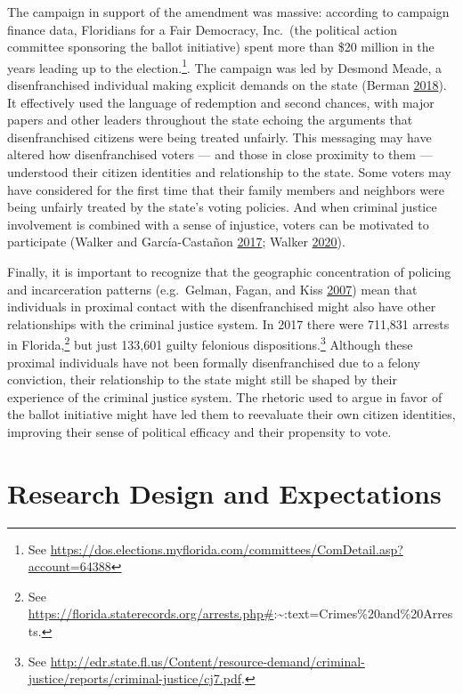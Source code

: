 \documentclass[
  12pt,
]{article}
\begin{document}
The campaign in support of the amendment was massive: according to campaign finance data, Floridians for a Fair Democracy, Inc.~(the political action committee sponsoring the ballot initiative) spent more than \$20 million in the years leading up to the election.\footnote{See \url{https://dos.elections.myflorida.com/committees/ComDetail.asp?account=64388}}. The campaign was led by Desmond Meade, a disenfranchised individual making explicit demands on the state (Berman \protect\hyperlink{ref-Berman2018}{2018}). It effectively used the language of redemption and second chances, with major papers and other leaders throughout the state echoing the arguments that disenfranchised citizens were being treated unfairly. This messaging may have altered how disenfranchised voters --- and those in close proximity to them --- understood their citizen identities and relationship to the state. Some voters may have considered for the first time that their family members and neighbors were being unfairly treated by the state's voting policies. And when criminal justice involvement is combined with a sense of injustice, voters can be motivated to participate (Walker and García-Castañon \protect\hyperlink{ref-Walker2017}{2017}; Walker \protect\hyperlink{ref-Walker2020}{2020}).

Finally, it is important to recognize that the geographic concentration of policing and incarceration patterns (e.g.~Gelman, Fagan, and Kiss \protect\hyperlink{ref-Gelman2007}{2007}) mean that individuals in proximal contact with the disenfranchised might also have other relationships with the criminal justice system. In 2017 there were 711,831 arrests in Florida,\footnote{See \url{https://florida.staterecords.org/arrests.php\#}:\textasciitilde:text=Crimes\%20and\%20Arrests.} but just 133,601 guilty felonious dispositions.\footnote{See \url{http://edr.state.fl.us/Content/resource-demand/criminal-justice/reports/criminal-justice/cj7.pdf}.} Although these proximal individuals have not been formally disenfranchised due to a felony conviction, their relationship to the state might still be shaped by their experience of the criminal justice system. The rhetoric used to argue in favor of the ballot initiative might have led them to reevaluate their own citizen identities, improving their sense of political efficacy and their propensity to vote.

\hypertarget{research-design-and-expectations}{%
\section*{Research Design and Expectations}\label{research-design-and-expectations}}
\end{document}
